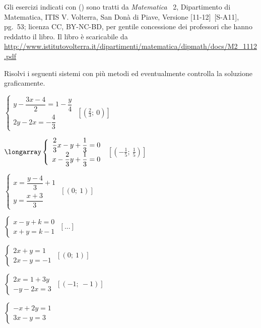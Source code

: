 Gli esercizi indicati con (\croce) sono tratti da \emph{Matematica }~2, 
Dipartimento di
Matematica, ITIS V. Volterra, San Donà di Piave, Versione [11-12]~[S-A11], 
pg.~53; licenza CC, BY-NC-BD, per gentile concessione dei
professori che hanno reddatto il libro. Il libro è scaricabile da 
\url{
http://www.istitutovolterra.it/dipartimenti/matematica/dipmath/docs/M2_1112.pdf}


\begin{esercizio}[\Ast]
 \label{ese:22.67}
 Risolvi i seguenti sistemi con più metodi ed eventualmente controlla
la soluzione graficamente.
\begin{multicols}{2}
\begin{enumeratea}
\item \(\left\{\begin{array}{l}
y-\dfrac{3x-4}{2}=1-\dfrac{y}{4}\\
2y-2x=-{\dfrac{4}{3}}\end{array}\right.\)
 \hfill \(\left[\left(\frac{2}{3};~0\right)\right]\)
\item \(\longarray\left\{\begin{array}{l}
\dfrac{2}{3}x-y+\dfrac{1}{3}=0\\
x-\dfrac{2}{3}y+\dfrac{1}{3}=0\end{array}\right.\)
 \hfill \(\left[\left(-{\frac{1}{5}};~\frac{1}{5}\right)\right]\)
\item \(\left\{\begin{array}{l}
x=\dfrac{y-4}{3}+1\\
y=\dfrac{x+3}{3}\end{array}\right.\)
 \hfill \(\left[(0;~1)\right]\)
\item \(\left\{\begin{array}{l}
x-y+k=0\\
x+y=k-1\end{array}\right.\)
 \hfill \(\left[...\right]\)
\item \(\left\{\begin{array}{l}2x+y=1 \\2x-y=-1\end{array}\right.\)
 \hfill \(\left[(0;~1)\right]\)
\item \(\left\{\begin{array}{l}2x=1+3y\\-y-2x=3\end{array}\right.\)
 \hfill \(\left[(-1;~-1)\right]\)
\item \(\left\{\begin{array}{l}-x+2y=1 \\3x-y=3\end{array}\right.\)

\end{enumeratea}
\end{multicols}
\end{esercizio}
